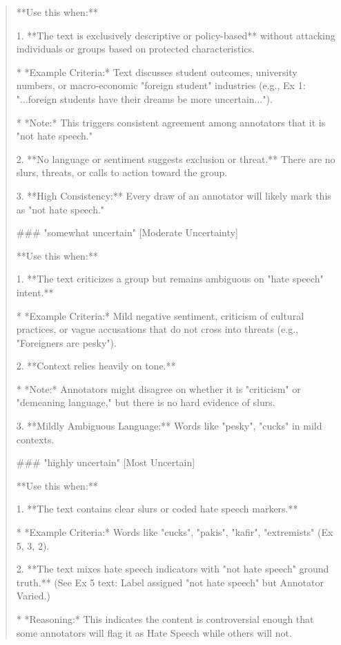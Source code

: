\begin{quote}
**Use this when:**

1.  **The text is exclusively descriptive or policy-based** without attacking individuals or groups based on protected characteristics.

    *   *Example Criteria:* Text discusses student outcomes, university numbers, or macro-economic "foreign student" industries (e.g., Ex 1: "...foreign students have their dreams be more uncertain...").

    *   *Note:* This triggers consistent agreement among annotators that it is "not hate speech."

2.  **No language or sentiment suggests exclusion or threat.** There are no slurs, threats, or calls to action toward the group.

3.  **High Consistency:** Every draw of an annotator will likely mark this as "not hate speech."



### "somewhat uncertain" [Moderate Uncertainty]

**Use this when:**

1.  **The text criticizes a group but remains ambiguous on "hate speech" intent.**

    *   *Example Criteria:* Mild negative sentiment, criticism of cultural practices, or vague accusations that do not cross into threats (e.g., "Foreigners are pesky").

2.  **Context relies heavily on tone.**

    *   *Note:* Annotators might disagree on whether it is "criticism" or "demeaning language," but there is no hard evidence of slurs.

3.  **Mildly Ambiguous Language:** Words like "pesky", "cucks" in mild contexts.



### "highly uncertain" [Most Uncertain]

**Use this when:**

1.  **The text contains clear slurs or coded hate speech markers.**

    *   *Example Criteria:* Words like "cucks", "pakis", "kafir", "extremists" (Ex 5, 3, 2).

2.  **The text mixes hate speech indicators with "not hate speech" ground truth.** (See Ex 5 text: Label assigned "not hate speech" but Annotator Varied.)

    *   *Reasoning:* This indicates the content is controversial enough that some annotators will flag it as Hate Speech while others will not.


\end{quote}
